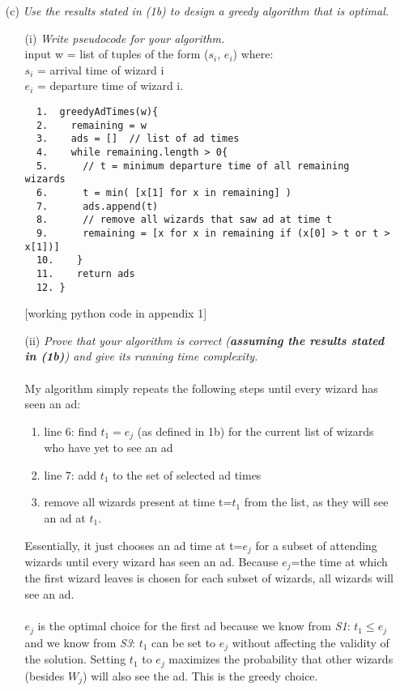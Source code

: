 \documentclass[12pt]{article}
\begin{document}
\begin{enumerate}
\item[(c)]\textit{Use the results stated in (1b) to design a greedy algorithm that is optimal.}
  \begin{enumerate}
  \item[(i)] \textit{Write pseudocode for your algorithm.}\\
  input w = list of tuples of the form ($s_i$, $e_i$) where: \\
  $s_i$ = arrival time of wizard i\\
   $e_i$ = departure time of wizard i.
  \begin{verbatim}
  1.  greedyAdTimes(w){
  2.    remaining = w
  3.    ads = []  // list of ad times
  4.    while remaining.length > 0{
  5.      // t = minimum departure time of all remaining wizards
  6.      t = min( [x[1] for x in remaining] ) 
  7.      ads.append(t)
  8.      // remove all wizards that saw ad at time t
  9.      remaining = [x for x in remaining if (x[0] > t or t > x[1])] 
  10.    }
  11.    return ads
  12. }
  \end{verbatim}
  [working python code in appendix 1]

  \pagebreak

  \item[(ii)] \textit{Prove that your algorithm is correct (\textbf{assuming the results stated in (1b)}) and give its running time complexity.}
  \\\\
  My algorithm simply repeats the following steps until every wizard has seen an ad:
  \begin{enumerate}
    \item line 6: find $t_1=e_j$ (as defined in 1b) for the current list of wizards who have yet to see an ad
    \item line 7: add $t_1$ to the set of selected ad times
    \item remove all wizards present at time t=$t_1$ from the list, as they will see an ad at $t_1$. 
  \end{enumerate}

  Essentially, it just chooses an ad time at t=$e_j$ for a subset of attending wizards until every wizard has seen an ad. Because $e_j$=the time at which the first wizard leaves is chosen for each subset of wizards, all wizards will see an ad. \\\\

  $e_j$ is the optimal choice for the first ad because we know from \textit{S1}: $t_1 \le e_j$ and we know from \textit{S3}: $t_1$ can be set to $e_j$ without affecting the validity of the solution. Setting $t_1$ to $e_j$ maximizes the probability that other wizards (besides $W_j$) will also see the ad. This is the greedy choice. 



\end{enumerate}
\end{enumerate}
\end{document}
